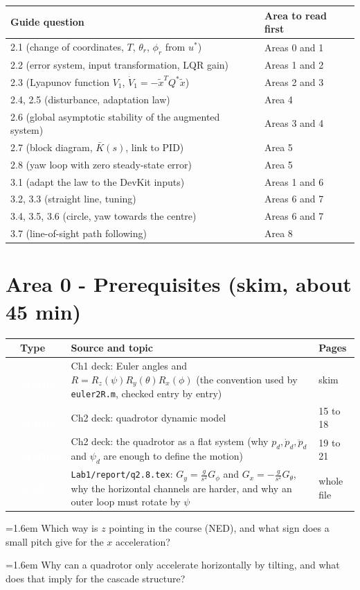 \documentclass[10pt,a4paper]{article}
\newcommand{\cb}{\raisebox{-0.35ex}{\Large$\square$}}
\newcommand{\srctag}[2]{\colorbox{#1}{\textcolor{white}{\textbf{\scriptsize\,#2\,}}}}
\newcommand{\SLIDES}{\srctag{slides}{SLIDES}}
\newcommand{\LAB}{\srctag{devkit}{LAB}}
\newcommand{\chk}[1]{\par\noindent\hangindent=1.6em\hangafter=1 \cb\hspace{0.6em}#1}
\begin{document}
\begin{tabularx}{\textwidth}{@{}l X@{}}
\toprule
Guide question & Area to read first\\
\midrule
2.1 (change of coordinates, $T$, $\theta_r$, $\phi_r$ from $u^*$) & Areas 0 and 1\\
2.2 (error system, input transformation, LQR gain) & Areas 1 and 2\\
2.3 (Lyapunov function $V_1$, $\dot V_1=-\tilde x^T Q^*\tilde x$) & Areas 2 and 3\\
2.4, 2.5 (disturbance, adaptation law) & Area 4\\
2.6 (global asymptotic stability of the augmented system) & Areas 3 and 4\\
2.7 (block diagram, $\bar K(s)$, link to PID) & Area 5\\
2.8 (yaw loop with zero steady-state error) & Area 5\\
3.1 (adapt the law to the DevKit inputs) & Areas 1 and 6\\
3.2, 3.3 (straight line, tuning) & Areas 6 and 7\\
3.4, 3.5, 3.6 (circle, yaw towards the centre) & Areas 6 and 7\\
3.7 (line-of-sight path following) & Area 8\\
\bottomrule
\end{tabularx}

\section*{Area 0 - Prerequisites (skim, about 45 min)}

\begin{tabularx}{\textwidth}{@{}C T X l@{}}
\toprule
\cb & Type & Source and topic & Pages\\
\midrule
\cb & \SLIDES & Ch1 deck: Euler angles and $R=R_z(\psi)R_y(\theta)R_x(\phi)$ (the convention used by \texttt{euler2R.m}, checked entry by entry) & skim\\
\cb & \SLIDES & Ch2 deck: quadrotor dynamic model & 15 to 18\\
\cb & \SLIDES & Ch2 deck: the quadrotor as a flat system (why $p_d,\dot p_d,\ddot p_d$ and $\psi_d$ are enough to define the motion) & 19 to 21\\
\cb & \LAB & \texttt{Lab1/report/q2.8.tex}: $G_y=\tfrac{g}{s^2}G_\phi$ and $G_x=-\tfrac{g}{s^2}G_\theta$, why the horizontal channels are harder, and why an outer loop must rotate by $\psi$ & whole file\\
\bottomrule
\end{tabularx}
\begin{selfcheck}
\chk{Which way is $z$ pointing in the course (NED), and what sign does a small pitch give for the $x$ acceleration?}
\chk{Why can a quadrotor only accelerate horizontally by tilting, and what does that imply for the cascade structure?}
\end{selfcheck}
\end{document}
